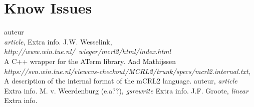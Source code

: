 \index{}\documentclass[a4paper,10pt]{article}
\theoremstyle{plain}
\theoremstyle{definition}
\begin{document}
\section{Know Issues}

\newpage
\begin{thebibliography}{99}   auteur\\
   \textit{article},
   Extra info.
   J.W. Wesselink,
   \textit{http://www.win.tue.nl/~wieger/mcrl2/html/index.html}\\
   A C++ wrapper for the ATerm library.
    Aad Mathijssen\\
   \textit{https://svn.win.tue.nl/viewcvs-checkout/MCRL2/trunk/specs/mcrl2.internal.txt},
   A description of the internal format of the mCRL2 language.
   auteur,
   \textit{article}
   Extra info.
   M. v. Weerdenburg (e.a??),
   \textit{gsrewrite}
   Extra info.
   J.F. Groote,
   \textit{linear}
   Extra info.

\end{thebibliography}

\newpage
\end{document}
